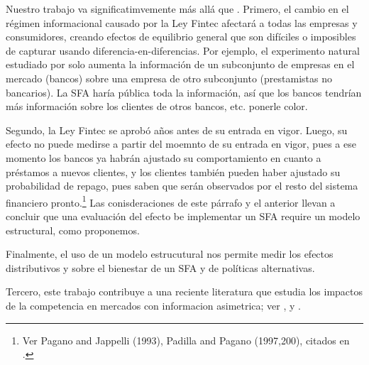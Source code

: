 \documentclass[11pt]{article}
\theoremstyle{plain}
\theoremstyle{plain}
\begin{document}
Nuestro trabajo va significatimvemente más allá que \textcite{foley_effects_2022}. Primero, el cambio en el régimen informacional causado por la Ley Fintec afectará a todas las empresas y consumidores, creando efectos de equilibrio general que son difíciles o imposibles de capturar usando diferencia-en-diferencias. Por ejemplo, el experimento natural estudiado por \textcite{foley_effects_2022} solo aumenta la información de un subconjunto de empresas en el mercado (bancos) sobre una empresa de otro subconjunto (prestamistas no bancarios). La SFA haría pública toda la información, así que los bancos tendrían más información sobre los clientes de otros bancos, etc. ponerle color. 

Segundo, la Ley Fintec se aprobó años antes de su entrada en vigor. Luego, su efecto no puede medirse a partir del moemnto de su entrada en vigor, pues a ese momento los bancos ya habrán ajustado su comportamiento en cuanto a préstamos a nuevos clientes, y los clientes también pueden haber ajustado su probabilidad de repago, pues saben que serán observados por el resto del sistema financiero pronto.\footnote{Ver Pagano and Jappelli (1993), Padilla and Pagano (1997,200), citados en \textcite{foley_effects_2022}.} Las conisderaciones de este párrafo y el anterior llevan a concluir que una evaluación del efecto be implementar un SFA require un modelo estructural, como proponemos.

Finalmente, el uso de un modelo estrucutural nos permite medir los efectos distributivos y sobre el bienestar de un SFA y de políticas alternativas.


Tercero, este trabajo contribuye a una reciente literatura que estudia los impactos de la competencia en mercados con informacion asimetrica; ver \textcite{allen_search_2019}, \textcite{cuesta_price_2018} y \textcite{cosconati_competing_2025}. 
\end{document}
